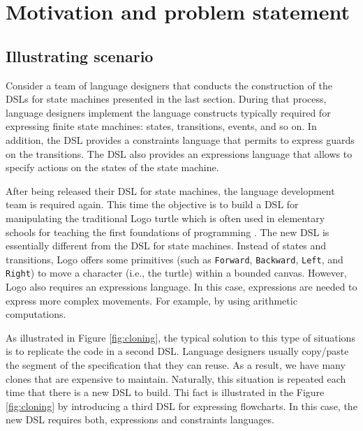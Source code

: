\section{Motivation and problem statement}

\subsection{Illustrating scenario}

Consider a team of language designers that conducts the construction of the DSLs for state machines presented in the last section. During that process, language designers implement the language constructs typically required for expressing finite state machines: states, transitions, events, and so on. In addition, the DSL provides a constraints language that permits to express guards on the transitions. The DSL also provides an expressions language that allows to specify actions on the states of the state machine. 

After being released their DSL for state machines, the language development team is required again. This time the objective is to build a DSL for manipulating the traditional Logo turtle which is often used in elementary schools for teaching the first foundations of programming \cite{Olson:1987}. The new DSL is essentially different from the DSL for state machines. Instead of states and transitions, Logo offers some primitives (such as \texttt{Forward}, \texttt{Backward}, \texttt{Left}, and \texttt{Right}) to move a character (i.e., the turtle) within a bounded canvas. However, Logo also requires an expressions language. In this case, expressions are needed to express more complex movements. For example, by using arithmetic computations.

As illustrated in Figure \ref{fig:cloning}, the typical solution to this type of situations is to replicate the code in a second DSL. Language designers usually copy/paste the segment of the specification that they can reuse. As a result, we have many clones that are expensive to maintain. Naturally, this situation is repeated each time that there is a new DSL to build. Thi fact is illustrated in the Figure \ref{fig:cloning} by introducing a third DSL for expressing flowcharts. In this case, the new DSL requires both, expressions and constraints languages. 

